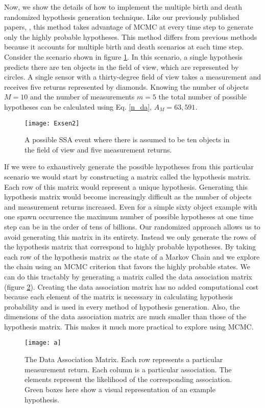 \documentclass[10pt, conference]{IEEEtran}
\begin{document}
Now, we show the details of how to implement the multiple birth and death randomized hypothesis generation technique. Like our previously published papers, \cite{Faber1,Faber2}, this method takes advantage of MCMC at every time step to generate only the highly probable hypotheses. This method differs from previous methods because it accounts for multiple birth and death scenarios at each time step. Consider the scenario shown in figure \ref{EXsen}. In this scenario, a single hypothesis predicts there are ten objects in the field of view, which are represented by circles. A single sensor with a thirty-degree field of view takes a measurement and receives five returns represented by diamonds. Knowing the number of objects $M=10$ and the number of measurements $m=5$ the total number of possible hypotheses can be calculated using Eq. \eqref{n_da}, $A_{M}=63,591$.
\begin{figure}[h]
\centering
\texttt{[image: Exsen2]}
\caption{A possible SSA event where there is assumed to be ten objects in the field of view and five measurement returns.}
\label{EXsen}
\end{figure}
If we were to exhaustively generate the possible hypotheses from this particular scenario we would start by constructing a matrix called the hypothesis matrix. Each row of this matrix would represent a unique hypothesis. Generating this hypothesis matrix would become increasingly difficult as the number of objects and measurement returns increased. Even for a simple sixty object example with one spawn occurrence the maximum number of possible hypotheses at one time step can be in the order of tens of billions. Our randomized approach allows us to avoid generating this matrix in its entirety. Instead we only generate the rows of the hypothesis matrix that correspond to highly probable hypotheses. By taking each row of the hypothesis matrix as the state of a Markov Chain and we explore the chain using an MCMC criterion that favors the highly probable states. 
We can do this tractably by generating a matrix called the data association matrix (figure \ref{da}). Creating the data association matrix has no added computational cost because each element of the matrix is necessary in calculating hypothesis probability and is used in every method of hypothesis generation. Also, the dimensions of the data association matrix are much smaller than those of the hypothesis matrix. This makes it much more practical to explore using MCMC.  
\begin{figure}[h]
\centering
\texttt{[image: a]}
\caption{The Data Association Matrix. Each row represents a particular measurement return. Each column is a particular association. The elements represent the likelihood of the corresponding association. Green boxes here show a visual representation of an example hypothesis.}
\label{da}
\end{figure}
\end{document}
